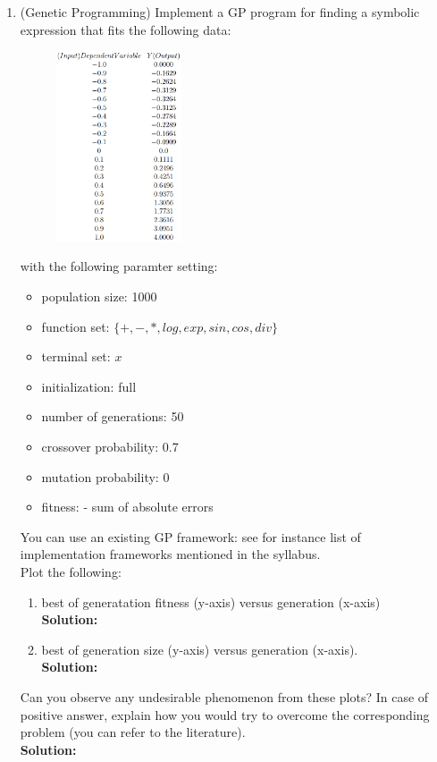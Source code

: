 \documentclass[a4paper]{article}
\begin{document}
\begin{enumerate}
	\item (Genetic Programming) Implement a GP program for finding a symbolic expression that fits the following data:

	\begin{figure}[ht!]
	\centering
  	\includegraphics[width=0.35\textwidth]{images/table.PNG}
	\end{figure}	

with the following paramter setting:
\begin{itemize}
	\item population size: 1000
	\item function set: $\{+,-,*,log,exp,sin,cos,div \}$
	\item terminal set: $x$
	\item initialization: full
	\item number of generations: 50
	\item crossover probability: 0.7
	\item mutation probability: 0
	\item fitness: - sum of absolute errors
\end{itemize}

You can use an existing GP framework: see for instance list of implementation frameworks mentioned in the syllabus.\\

Plot the following:

\begin{enumerate}
	\item best of generatation fitness (y-axis) versus generation (x-axis)\\
	\textbf{Solution:}\\
	
	\item best of generation size (y-axis) versus generation (x-axis).\\
	\textbf{Solution:}\\
\end{enumerate}

Can you observe any undesirable phenomenon from these plots? In case of positive answer, explain how you would try to overcome the corresponding problem (you can refer to the literature).\\
\textbf{Solution:}\\

\end{enumerate}
\end{document}
